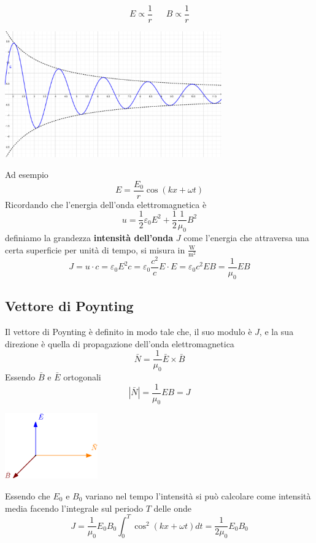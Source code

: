 \documentclass[10pt, letterpaper]{report}
\begin{document}
$$ E\propto \frac{1}{r} \ \ \ \ \ \ \  
B\propto \frac{1}{r}$$
\begin{center}
    \includegraphics[width=0.7\textwidth]{images/andamentoModuloOnda.pdf}
\end{center}
Ad esempio 
$$ E=\frac{E_0}{r}\cos(kx+\omega t)$$
Ricordando che l'energia dell'onda elettromagnetica è 
$$u=\frac{1}{2}\varepsilon_0E^2+\frac{1}{2}\frac{1}{\mu_0}B^2 $$
definiamo la grandezza \textbf{intensità dell'onda} $J$ come l'energia che attraversa una certa superficie per unità di tempo, si misura in $\frac{\text{W}}{\text{m}^2}$
$$ J=u\cdot c=\varepsilon_0E^2c=\varepsilon_0\frac{c^2}{c}E\cdot E=\varepsilon_0c^2EB=\frac{1}{\mu_0}EB$$
\subsection{Vettore di Poynting}
Il vettore di Poynting è definito in modo tale che, il suo modulo è $J$, e la sua direzione è quella di propagazione dell'onda elettromagnetica 
$$\bar N = \frac{1}{\mu_0}\bar E \times \bar B $$
Essendo $\bar B $ e $\bar E$ ortogonali 
$$ |\bar N|=\frac{1}{\mu_0} E   B=J$$
\begin{center}
    \includegraphics[width=0.3\textwidth]{images/Poynting.eps}
\end{center}
Essendo che $E_0$ e $B_0$ variano nel tempo l'intensità si può calcolare come intensità media facendo l'integrale sul periodo $T$ delle onde 
$$ J=\frac{1}{\mu_0}E_0B_0\int_0^T\cos^2(kx+\omega t)dt=\frac{1}{2\mu_0}E_0B_0$$



\end{document}
